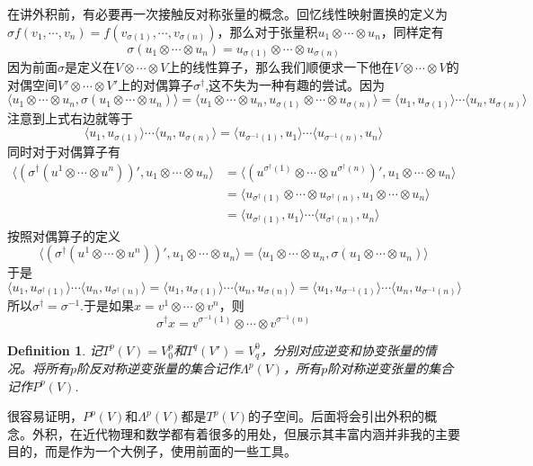 \documentclass[11pt,a4paper,openany]{book}%
\theoremstyle{plain}%
\newtheorem{defi}{Definition}[chapter]%
\begin{document}
\indent 在讲外积前，有必要再一次接触反对称张量的概念。回忆线性映射置换的定义为$\sigma f(v_1,\cdots,v_n)=f(v_{\sigma(1)},\cdots,v_{\sigma(n)})$，那么对于张量积$u_1\otimes \cdots \otimes u_n$，同样定有
\[
\sigma(u_1\otimes \cdots \otimes u_n)=u_{\sigma(1)}\otimes \cdots \otimes u_{\sigma(n)}
\]
因为前面$\sigma$是定义在$V\otimes \cdots \otimes V$上的线性算子，那么我们顺便求一下他在$V\otimes \cdots \otimes V$的对偶空间$V'\otimes \cdots \otimes V'$上的对偶算子$\sigma^\dag$,这不失为一种有趣的尝试。因为
\[
\langle u_1\otimes \cdots \otimes u_n,\sigma(u_1\otimes \cdots \otimes u_n)\rangle=\langle u_1\otimes \cdots \otimes u_n,u_{\sigma(1)}\otimes \cdots \otimes u_{\sigma(n)}\rangle=\langle u_1,u_{\sigma(1)} \rangle \cdots \langle u_n,u_{\sigma(n)} \rangle
\]
注意到上式右边就等于
\[
\langle u_1,u_{\sigma(1)} \rangle \cdots \langle u_n,u_{\sigma(n)} \rangle=\langle u_{\sigma^{-1}(1)},u_{1} \rangle \cdots \langle u_{\sigma^{-1}(n)},u_{n} \rangle
\]
同时对于对偶算子有
\begin{equation*}
\begin{split}
\langle(\sigma^\dag(u^1\otimes \cdots \otimes u^n))',u_1\otimes \cdots \otimes u_n\rangle &=\langle(u^{\sigma^\dag(1)}\otimes \cdots \otimes u^{\sigma^\dag(n)})',u_1\otimes \cdots \otimes u_n\rangle \\
&=\langle u_{\sigma^\dag(1)}\otimes \cdots \otimes u_{\sigma^\dag(n)},u_1\otimes \cdots \otimes u_n\rangle\\
&=\langle u_{\sigma^{\dag}(1)},u_{1} \rangle \cdots \langle u_{\sigma^{\dag}(n)},u_{n} \rangle
\end{split}
\end{equation*}
按照对偶算子的定义
\[
\langle(\sigma^\dag(u^1\otimes \cdots \otimes u^n))',u_1\otimes \cdots \otimes u_n\rangle =\langle u_1\otimes \cdots \otimes u_n,\sigma(u_1\otimes \cdots \otimes u_n)\rangle
\]
于是
\[
\langle u_{1},u_{\sigma^\dag(1)} \rangle \cdots \langle u_{n},u_{\sigma^\dag(n)} \rangle=\langle u_1,u_{\sigma(1)} \rangle \cdots \langle u_n,u_{\sigma(n)} \rangle=\langle u_{1},u_{\sigma^{-1}(1)} \rangle \cdots \langle u_{n},u_{\sigma^{-1}(n)} \rangle
\]
所以$\sigma^\dag=\sigma^{-1}$.于是如果$x=v^1\otimes \cdots \otimes v^n$，则
\[
\sigma^\dag x=v^{\sigma^{-1}(1)}\otimes \cdots \otimes v^{\sigma^{-1}(n)}
\]
\begin{defi}
记$T^p(V)=V^p_0$和$T^q(V')=V^0_q$，分别对应逆变和协变张量的情况。将所有$p$阶反对称逆变张量的集合记作$\Lambda^p(V)$，所有$p$阶对称逆变张量的集合记作$P^p(V)$.
\end{defi}
很容易证明，$P^p(V)$和$\Lambda^p(V)$都是$T^p(V)$的子空间。后面将会引出外积的概念。外积，在近代物理和数学都有着很多的用处，但展示其丰富内涵并非我的主要目的，而是作为一个大例子，使用前面的一些工具。
\end{document}
